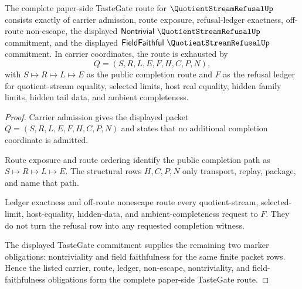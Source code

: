 \begin{theorem}
\label{thm:quotient-stream-refusal-tastegate-marker-route}
The complete paper-side TasteGate route for $\QuotientStreamRefusalUp$ consists exactly of carrier admission, route exposure, refusal-ledger exactness, off-route non-escape, the displayed $\mathsf{Nontrivial}\ \QuotientStreamRefusalUp$ commitment, and the displayed $\mathsf{FieldFaithful}\ \QuotientStreamRefusalUp$ commitment. In carrier coordinates, the route is exhausted by
$$
Q=(S,R,L,E,F,H,C,P,N),
$$
with $S \longmapsto R \longmapsto L \longmapsto E$ as the public completion route and $F$ as the refusal ledger for quotient-stream equality, selected limits, host real equality, hidden family limits, hidden tail data, and ambient completeness.
\end{theorem}
\begin{proof}
Carrier admission gives the displayed packet $Q=(S,R,L,E,F,H,C,P,N)$ and states that no additional completion coordinate is admitted.

Route exposure and route ordering identify the public completion path as $S \longmapsto R \longmapsto L \longmapsto E$. The structural rows $H,C,P,N$ only transport, replay, package, and name that path.

Ledger exactness and off-route nonescape route every quotient-stream, selected-limit, host-equality, hidden-data, and ambient-completeness request to $F$. They do not turn the refusal row into any requested completion witness.

The displayed TasteGate commitment supplies the remaining two marker obligations: nontriviality and field faithfulness for the same finite packet rows. Hence the listed carrier, route, ledger, non-escape, nontriviality, and field-faithfulness obligations form the complete paper-side TasteGate route.
\end{proof}

